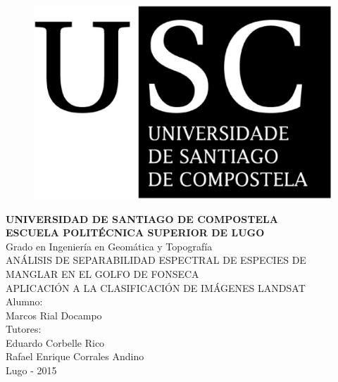 




\begin{figure}[t]
\centering
\includegraphics[scale=0.2]{./Imagenes/USCbn.eps} %
\end{figure}

\begin{center}
\textbf{{\Huge UNIVERSIDAD DE SANTIAGO DE COMPOSTELA}\\[1cm]
{\LARGE ESCUELA POLITÉCNICA SUPERIOR DE LUGO}}\\[1cm]
{\Large Grado en Ingeniería en Geomática y Topografía}\\[3cm]
{\Large ANÁLISIS DE SEPARABILIDAD ESPECTRAL DE ESPECIES DE MANGLAR EN EL GOLFO DE FONSECA}\\
{\Large APLICACIÓN A LA CLASIFICACIÓN DE IMÁGENES LANDSAT}\\[2cm]
{\normalsize \vfill{Alumno:\\Marcos Rial Docampo\\Tutores:\\Eduardo Corbelle Rico\\Rafael Enrique Corrales Andino}}\\
{\footnotesize \vfill{Lugo - 2015%
}}
\end{center}